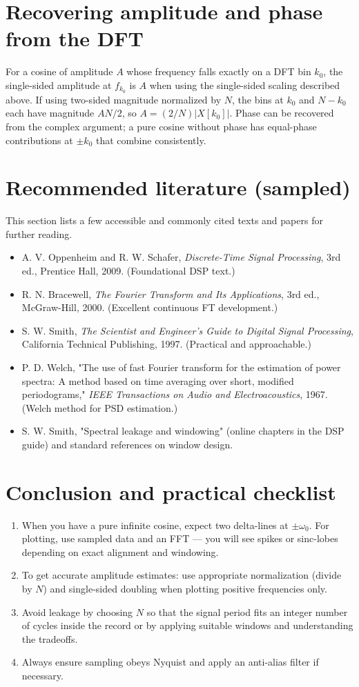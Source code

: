 \documentclass[a4paper]{article}
\begin{document}
\section{Recovering amplitude and phase from the DFT}
For a cosine of amplitude $A$ whose frequency falls exactly on a DFT bin $k_0$, the single-sided amplitude at $f_{k_0}$ is $A$ when using the single-sided scaling described above. If using two-sided magnitude normalized by $N$, the bins at $k_0$ and $N-k_0$ each have magnitude $AN/2$, so $A=(2/N)|X[k_0]|$. Phase can be recovered from the complex argument; a pure cosine without phase has equal-phase contributions at $\pm k_0$ that combine consistently.

\section{Recommended literature (sampled)}
This section lists a few accessible and commonly cited texts and papers for further reading.
\begin{itemize}
\item A. V. Oppenheim and R. W. Schafer, \textit{Discrete-Time Signal Processing}, 3rd ed., Prentice Hall, 2009. (Foundational DSP text.)
\item R. N. Bracewell, \textit{The Fourier Transform and Its Applications}, 3rd ed., McGraw-Hill, 2000. (Excellent continuous FT development.)
\item S. W. Smith, \textit{The Scientist and Engineer's Guide to Digital Signal Processing}, California Technical Publishing, 1997. (Practical and approachable.)
\item P. D. Welch, "The use of fast Fourier transform for the estimation of power spectra: A method based on time averaging over short, modified periodograms," \textit{IEEE Transactions on Audio and Electroacoustics}, 1967. (Welch method for PSD estimation.)
\item S. W. Smith, "Spectral leakage and windowing" (online chapters in the DSP guide) and standard references on window design.
\end{itemize}

\section{Conclusion and practical checklist}
\begin{enumerate}
\item When you have a pure infinite cosine, expect two delta-lines at $\pm\omega_0$. For plotting, use sampled data and an FFT — you will see spikes or sinc-lobes depending on exact alignment and windowing.
\item To get accurate amplitude estimates: use appropriate normalization (divide by $N$) and single-sided doubling when plotting positive frequencies only.
\item Avoid leakage by choosing $N$ so that the signal period fits an integer number of cycles inside the record or by applying suitable windows and understanding the tradeoffs.
\item Always ensure sampling obeys Nyquist and apply an anti-alias filter if necessary.
\end{enumerate}
\end{document}

